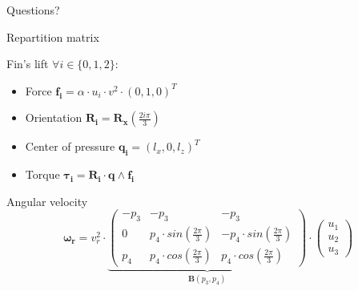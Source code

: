 \documentclass{beamer}
\begin{document}
       

    \appendix

    \begin{frame}[standout]
        Questions?
    \end{frame}

    \begin{frame}{Repartition matrix}
        \centering
        \begin{minipage}{0.8\textwidth}
            \begin{block}{Fin's lift}
                $\forall i \in \{0, 1, 2\}:$
                \begin{itemize}
                    \item Force $\mathbf{f_i} = \alpha \cdot u_i \cdot v^2 \cdot (0, 1, 0)^T$
                    \item Orientation $\mathbf{R_i} = \mathbf{R_x}\left(\frac{2i\pi}{3}\right)$
                    \item Center of pressure $\mathbf{q_i} = (\mathit{l_x}, 0, \mathit{l_z})^T$
                    \item Torque $\mathbf{\tau_i} = \mathbf{R_i} \cdot \mathbf{q} \wedge \mathbf{f_i}$
                \end{itemize}
            \end{block}
            \begin{block}{Angular velocity}
                \begin{equation}
                    \mathbf{\omega_r} = v_r^2 \cdot 
                        \underbrace{
                            \left(
                            \begin{smallmatrix}
                                -p_3 & -p_3 & -p_3 \\
                                0 & p_4 \cdot sin(\frac{2\pi}{3}) & -p_4 \cdot sin(\frac{2\pi}{3}) \\
                                p_4 & p_4 \cdot cos(\frac{2\pi}{3}) & p_4 \cdot cos(\frac{2\pi}{3})
                            \end{smallmatrix}
                            \right)
                        }_{\mathbf{B}(p_3, p_4)} \cdot \left(\begin{smallmatrix}u_1\\ u_2\\ u_3\end{smallmatrix}\right)
                \end{equation}
            \end{block}
        \end{minipage}
    \end{frame}
    
\end{document}

